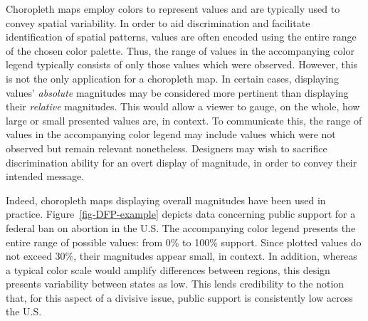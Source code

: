 \documentclass[
]{interact}
\begin{document}
Choropleth maps employ colors to represent values and are typically used
to convey spatial variability. In order to aid discrimination and
facilitate identification of spatial patterns, values are often encoded
using the entire range of the chosen color palette. Thus, the range of
values in the accompanying color legend typically consists of only those
values which were observed. However, this is not the only application
for a choropleth map. In certain cases, displaying values'
\emph{absolute} magnitudes may be considered more pertinent than
displaying their \emph{relative} magnitudes. This would allow a viewer
to gauge, on the whole, how large or small presented values are, in
context. To communicate this, the range of values in the accompanying
color legend may include values which were not observed but remain
relevant nonetheless. Designers may wish to sacrifice discrimination
ability for an overt display of magnitude, in order to convey their
intended message.

Indeed, choropleth maps displaying overall magnitudes have been used in
practice. Figure~\ref{fig-DFP-example} depicts data concerning public
support for a federal ban on abortion in the U.S. The accompanying color
legend presents the entire range of possible values: from 0\% to 100\%
support. Since plotted values do not exceed 30\%, their magnitudes
appear small, in context. In addition, whereas a typical color scale
would amplify differences between regions, this design presents
variability between states as low. This lends credibility to the notion
that, for this aspect of a divisive issue, public support is
consistently low across the U.S.
\end{document}
